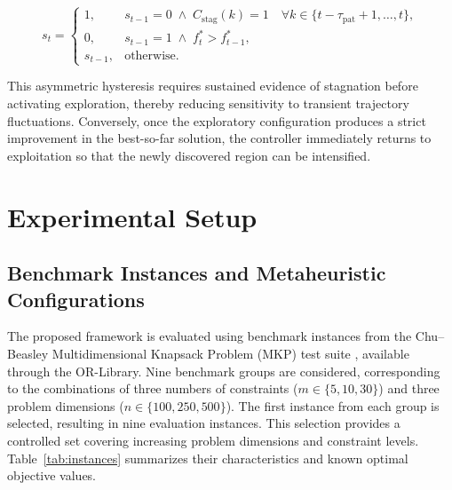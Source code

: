 \documentclass[journal,article,submit,moreauthors]{Definitions/mdpi}
\begin{document}
\begin{equation}
s_t =
\begin{cases}
1,
&
s_{t-1}=0
\;\land\;
C_{\mathrm{stag}}(k)=1
\quad
\forall k\in
\{t-\tau_{\mathrm{pat}}+1,\ldots,t\},
\\[2mm]
0,
&
s_{t-1}=1
\;\land\;
f_t^*>f_{t-1}^*,
\\[2mm]
s_{t-1},
&
\text{otherwise}.
\end{cases}
\label{eq:binary_complex}
\end{equation}

This asymmetric hysteresis requires sustained evidence of stagnation before
activating exploration, thereby reducing sensitivity to transient trajectory
fluctuations. Conversely, once the exploratory configuration produces a
strict improvement in the best-so-far solution, the controller immediately
returns to exploitation so that the newly discovered region can be
intensified.



\section{Experimental Setup}
\label{sec:experimental_setup}

\subsection{Benchmark Instances and Metaheuristic Configurations}
\label{sec:instances}

The proposed framework is evaluated using benchmark instances from the
Chu--Beasley Multidimensional Knapsack Problem (MKP) test suite
\cite{chu1998genetic}, available through the OR-Library. Nine benchmark
groups are considered, corresponding to the combinations of three numbers
of constraints ($m\in\{5,10,30\}$) and three problem dimensions
($n\in\{100,250,500\}$). The first instance from each group is selected,
resulting in nine evaluation instances. This selection provides a controlled
set covering increasing problem dimensions and constraint levels.
Table~\ref{tab:instances} summarizes their characteristics and known optimal
objective values.
\end{document}
